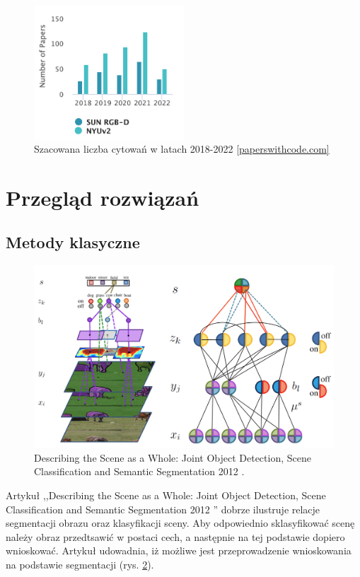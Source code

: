 \begin{figure}
    \centering
    \includegraphics[width=0.5\textwidth]{images/stats-dataset.png}
    \caption[]{Szacowana liczba cytowań w latach 2018-2022 \href{https://paperswithcode.com/dataset/sun-rgb-d}{[paperswithcode.com]}}
    \label{fig:sun-vs-nyu}
\end{figure}

\section{Przegląd rozwiązań}
\subsection{Metody klasyczne}
\begin{figure}
    \includegraphics[width=\textwidth]{images/joint-segmentation-and-classification.png}
    \caption{Describing the Scene as a Whole: Joint Object Detection, Scene Classification and Semantic Segmentation 2012 \cite{yao2012describing}.}
    \label{fig:old-school-arch}
\end{figure}

Artykuł ,,Describing the Scene as a Whole: Joint Object Detection, Scene Classification and Semantic Segmentation 2012 \cite{yao2012describing}'' dobrze ilustruje relacje segmentacji obrazu oraz klasyfikacji sceny. Aby odpowiednio sklasyfikować scenę należy obraz przedtsawić w postaci cech, a następnie na tej podstawie dopiero wnioskować. Artykuł \cite{yao2012describing} udowadnia, iż możliwe jest przeprowadzenie wnioskowania na podstawie segmentacji (rys. \ref{fig:old-school-arch}).

